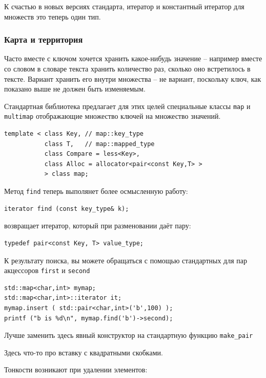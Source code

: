 \documentclass[a4paper,12pt,oneside]{article}
\begin{document}
К счастью в новых версиях стандарта, итератор и константный итератор для множеств это теперь один тип.

\subsubsection{Карта и территория}

Часто вместе с ключом хочется хранить какое-нибудь значение -- например вместе со словом в словаре текста хранить количество раз, сколько оно встретилось в тексте. Вариант хранить его внутри множества -- не вариант, поскольку ключ, как показано выше не должен быть изменяемым.

Стандартная библиотека предлагает для этих целей специальные классы \lstinline!map! и \lstinline!multimap! отображающие множество ключей на множество значений.

\begin{lstlisting}
template < class Key, // map::key_type
           class T,   // map::mapped_type
           class Compare = less<Key>, 
           class Alloc = allocator<pair<const Key,T> >
           > class map;
\end{lstlisting}

Метод \lstinline!find! теперь выполянет более осмысленную работу:

\begin{lstlisting}
iterator find (const key_type& k);
\end{lstlisting}

возвращает итератор, который при разменовании даёт пару:

\begin{lstlisting}
typedef pair<const Key, T> value_type;
\end{lstlisting}

К результату поиска, вы можете обращаться с помощью стандартных для пар акцессоров \lstinline!first! и \lstinline!second!

\begin{lstlisting}
std::map<char,int> mymap;
std::map<char,int>::iterator it;
mymap.insert ( std::pair<char,int>('b',100) );
printf ("b is %d\n", mymap.find('b')->second);
\end{lstlisting}

Лучше заменить здесь явный конструктор на стандартную функцию \lstinline!make_pair!

Здесь что-то про вставку с квадратными скобками.

Тонкости возникают при удалении элементов:
\end{document}

